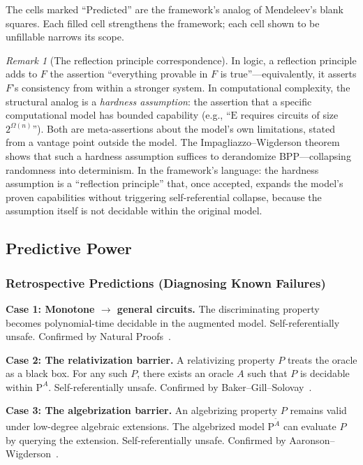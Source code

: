 \documentclass[11pt,a4paper]{article}
\theoremstyle{plain}
\theoremstyle{definition}
\theoremstyle{remark}
\newtheorem{remark}[theorem]{Remark}
\begin{document}
The cells marked ``Predicted'' are the framework's analog of Mendeleev's blank squares. Each filled cell strengthens the framework; each cell shown to be unfillable narrows its scope.

\begin{remark}[The reflection principle correspondence]
In logic, a reflection principle adds to $F$ the assertion ``everything provable in $F$ is true''---equivalently, it asserts $F$'s consistency from within a stronger system. In computational complexity, the structural analog is a \emph{hardness assumption}: the assertion that a specific computational model has bounded capability (e.g., ``$\mathrm{E}$ requires circuits of size $2^{\Omega(n)}$''). Both are meta-assertions about the model's own limitations, stated from a vantage point outside the model. The Impagliazzo--Wigderson theorem~\cite{ImpagliazzoWigderson1997} shows that such a hardness assumption suffices to derandomize BPP---collapsing randomness into determinism. In the framework's language: the hardness assumption is a ``reflection principle'' that, once accepted, expands the model's proven capabilities without triggering self-referential collapse, because the assumption itself is not decidable within the original model.
\end{remark}

\subsection{Predictive Power}

\subsubsection{Retrospective Predictions (Diagnosing Known Failures)}

\textbf{Case 1: Monotone $\to$ general circuits.} The discriminating property becomes polynomial-time decidable in the augmented model. Self-referentially unsafe. Confirmed by Natural Proofs~\cite{RazborovRudich1994}.

\textbf{Case 2: The relativization barrier.} A relativizing property $P$ treats the oracle as a black box. For any such $P$, there exists an oracle $A$ such that $P$ is decidable within $\mathrm{P}^A$. Self-referentially unsafe. Confirmed by Baker--Gill--Solovay~\cite{BakerGillSolovay1975}.

\textbf{Case 3: The algebrization barrier.} An algebrizing property $P$ remains valid under low-degree algebraic extensions. The algebrized model $\mathrm{P}^{\tilde{A}}$ can evaluate $P$ by querying the extension. Self-referentially unsafe. Confirmed by Aaronson--Wigderson~\cite{AaronsonWigderson2009}.
\end{document}
